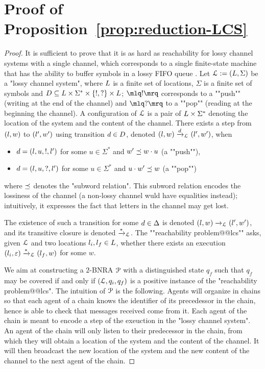 \section{Proof of Proposition~\ref{prop:reduction-LCS}}
\label{app:reduction-lcs}

\propReductionLCS*

\begin{proof}
	It is sufficient to prove that it is as hard as reachability for lossy channel systems with a single channel, which corresponds to a single finite-state machine that has the ability to buffer symbols in a lossy FIFO queue \cite{Schnoebelen2002verifying}.
	Let $\mathcal{L} := (L,\Sigma)$ be a "lossy channel system", where $L$ is a finite set of locations, $\Sigma$ is a finite set of symbols and $D \subseteq L \times \Sigma^* \times \{!, ?\} \times L$; $\quotemarks{!}$ corresponds to a ""push"" (writing at the end of the channel) and $\quotemarks{?}$ to a ""pop"" (reading at the beginning the channel). A configuration of $\mathcal{L}$ is a pair of $L \times \Sigma^*$ denoting the location of the system and the content of the channel. There exists a step from $(l,w)$ to $(l',w')$ using transition $d \in D$, denoted $(l,w) \xrightarrow{d}_{\mathcal{L}} (l',w')$, when
	\begin{itemize}
		\item $d = (l,u,!,l')$ for some $u \in \Sigma^*$ and $w' \preceq w \cdot u$ (a ""push""),
		\item $d = (l,u,?,l')$ for some $u \in \Sigma^*$ and $u \cdot w' \preceq w$ (a ""pop"")
	\end{itemize}
	where $\preceq$ denotes the "subword relation".
	This subword relation encodes the lossiness of the channel (a non-lossy channel wuld have equalities instead); intuitively, it expresses the fact that letters in the channel may get lost. 
	
	The existence of such a transition for some $d \in \Delta$ is denoted $(l,w) \xrightarrow{}_{\mathcal{L}} (l',w')$, and its transitive closure is denoted $\xrightarrow{*}_{\mathcal{L}}$. The ""reachability problem@@lcs"" asks, given $\mathcal{L}$ and two locations $l_i, l_f \in L$, whether there exists an execution $(l_i,\varepsilon) \xrightarrow{*}_{\mathcal{L}} (l_f, w)$ for some $w$. 
	
	We aim at constructing a $2$-BNRA $\mathcal{P}$ with a distinguished state $q_f$ such that $q_f$ may be covered if and only if $(\mathcal{L}, q_i, q_f)$ is a positive instance of the "reachability problem@@lcs". 
	The intuition of $\mathcal{P}$ is the following. Agents will organize in chains so that each agent of a chain knows the identifier of its precedessor in the chain, hence is able to check that messages received come from it. Each agent of the chain is meant to encode a step of the exeuction in the "lossy channel system". 
	An agent of the chain will only listen to their predecessor in the chain, from which they will obtain a location of the system and the content of the channel. It will then broadcast the new location of the system and the new content of the channel to the next agent of the chain. 
	

\end{proof}
